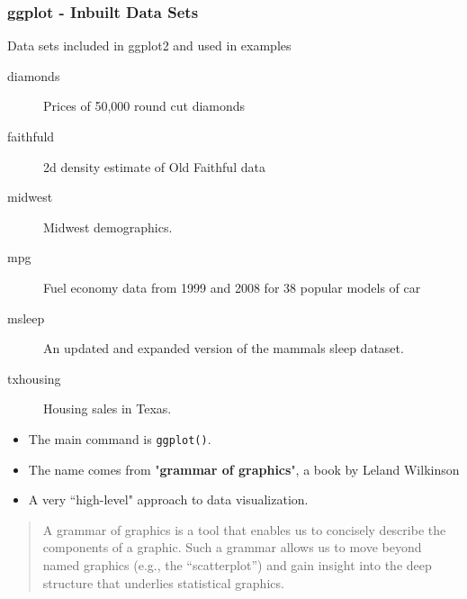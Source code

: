 \documentclass{beamer}
\begin{document}
\begin{frame}
	\frametitle{ggplot - Inbuilt Data Sets}
	\Large

Data sets included in ggplot2 and used in examples\smallskip
	\begin{description}


\item[diamonds]
Prices of 50,000 round cut diamonds


\item[faithfuld]
2d density estimate of Old Faithful data


\item[midwest]
Midwest demographics.

\item[mpg]
Fuel economy data from 1999 and 2008 for 38 popular models of car

\item[msleep]
An updated and expanded version of the mammals sleep dataset.




\item[txhousing]
Housing sales in Texas.
	\end{description}

\end{frame}

\begin{frame}[fragile]
\Large
\begin{itemize}
\item The main command is \texttt{ggplot()}.
\item The name comes from "\textbf{grammar of graphics}", a book by Leland Wilkinson
\item A very ``high-level" approach to data visualization.
\end{itemize}
{
	\large
\begin{framed}
\begin{quote}
	A grammar of graphics is a tool that enables us to concisely describe the components
	of a graphic. Such a grammar allows us to move beyond named graphics (e.g., the “scatterplot”)
	and gain insight into the deep structure that underlies statistical graphics.
\end{quote}
\end{framed}
}
\end{frame}
\end{document}
